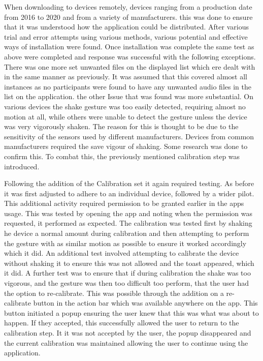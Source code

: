 \documentclass{l4proj}
\begin{document}
When downloading to devices remotely, devices ranging from a production date from 2016 to 2020 and from a variety of manufacturers. this was done to ensure that it was understood how the application could be distributed. After various trial and error attempts using various methods, various potential and effective ways of installation were found. Once installation was complete the same test as above were completed and response was successful with the following exceptions. There was one more set unwanted files on the displayed list which ere dealt with in the same manner as previously. It was assumed that this covered almost all instances as no participants were found to have any unwanted audio files in the list on the application. the other Issue that was found was more substantial. On various devices the shake gesture was too easily detected, requiring almost no motion at all, while others were unable to detect the gesture unless the device was very vigorously shaken. The reason for this is thought to be due to the sensitivity of the sensors used by different manufacturers. Devices from common manufacturers required the save vigour of shaking. Some research was done to confirm this. To combat this, the previously mentioned calibration step was introduced.

Following the addition of the Calibration set it again required testing. As before it was first adjusted to adhere to an individual device, followed by a wider pilot. This additional activity required permission to be granted earlier in the apps usage. This was tested by opening the app and noting when the permission was requested, it performed as expected. The calibration was tested first by shaking he device a normal amount during calibration and then attempting to perform the gesture with as similar motion as possible to ensure it worked accordingly which it did. An additional test involved attempting to calibrate the device without shaking it to ensure this was not allowed and the toast appeared, which it did. A further test was to ensure that if during calibration the shake was too vigorous, and the gesture was then too difficult too perform, that the user had the option to re-calibrate. This was possible through the addition on a re-calibrate button in the action bar which was available anywhere on the app. This button initiated a popup ensuring the user knew that this was what was about to happen. If they accepted, this successfully allowed the user to return to the calibration step. It it was not accepted by the user, the popup disappeared and the current calibration was maintained allowing the user to continue using the application.
\end{document}
